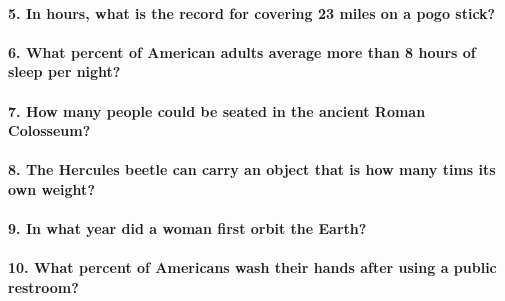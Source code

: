 \documentclass[]{article}
\let\oldparagraph\paragraph
\renewcommand{\paragraph}[1]{\oldparagraph{#1}\mbox{}}
\begin{document}
\vspace{0.75cm}

\paragraph{5. In hours, what is the record for covering 23 miles on a
pogo
stick?}\label{in-hours-what-is-the-record-for-covering-23-miles-on-a-pogo-stick}

\vspace{0.75cm}

\paragraph{6. What percent of American adults average more than 8 hours
of sleep per
night?}\label{what-percent-of-american-adults-average-more-than-8-hours-of-sleep-per-night}

\vspace{0.75cm}

\paragraph{7. How many people could be seated in the ancient Roman
Colosseum?}\label{how-many-people-could-be-seated-in-the-ancient-roman-colosseum}

\vspace{0.75cm}

\paragraph{8. The Hercules beetle can carry an object that is how many
tims its own
weight?}\label{the-hercules-beetle-can-carry-an-object-that-is-how-many-tims-its-own-weight}

\vspace{0.75cm}

\paragraph{9. In what year did a woman first orbit the
Earth?}\label{in-what-year-did-a-woman-first-orbit-the-earth}

\vspace{0.75cm}

\paragraph{10. What percent of Americans wash their hands after using a
public
restroom?}\label{what-percent-of-americans-wash-their-hands-after-using-a-public-restroom}
\end{document}
